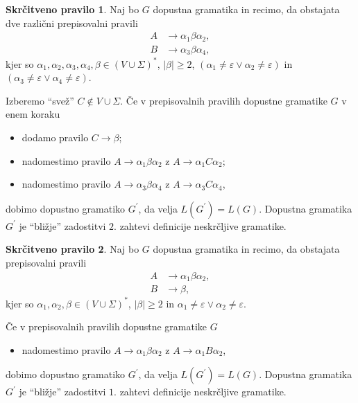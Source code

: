\documentclass[fin1, tisk]{fmfdelo}
\providecommand{\abs}[1]{\left\lvert #1 \right\rvert}
\theoremstyle{definition}
\newtheorem{pravilo}{Skrčitveno pravilo}
\begin{document}
\begin{pravilo}
    Naj bo $G$ dopustna gramatika in recimo, da obstajata dve različni prepisovalni pravili
    \begin{align*}
        A &\rightarrow \alpha_1 \beta \alpha_2, \\
        B &\rightarrow \alpha_3 \beta \alpha_4,
    \end{align*}
    kjer so $\alpha_1, \alpha_2, \alpha_3, \alpha_4, \beta \in (V \cup \Sigma)^*$, $\abs{\beta} \geq 2$,
    $(\alpha_1 \neq \varepsilon \vee \alpha_2 \neq \varepsilon)$ in 
    $(\alpha_3 \neq \varepsilon \vee \alpha_4 \neq \varepsilon)$.

    Izberemo ``svež'' $C \notin V \cup \Sigma$. Če v prepisovalnih 
    pravilih dopustne gramatike $G$ v enem koraku
    \begin{itemize}
        \item dodamo pravilo $C \rightarrow \beta$;
        \item nadomestimo pravilo $A \rightarrow \alpha_1 \beta \alpha_2$ 
        z $A \rightarrow \alpha_1 C \alpha_2$;
        \item nadomestimo pravilo $A \rightarrow \alpha_3 \beta \alpha_4$ 
        z $A \rightarrow \alpha_3 C \alpha_4$,
    \end{itemize}
    dobimo dopustno gramatiko $G^\prime$, da velja $L(G^\prime) = L(G)$. Dopustna gramatika 
    $G^\prime$ je ``bližje'' zadostitvi $2.$ zahtevi definicije neskrčljive gramatike.
\end{pravilo}

\begin{pravilo}
    Naj bo $G$ dopustna gramatika in recimo, da obstajata prepisovalni pravili
    \begin{align*}
        A &\rightarrow \alpha_1 \beta \alpha_2, \\
        B &\rightarrow \beta,
    \end{align*}
    kjer so $\alpha_1, \alpha_2, \beta \in (V \cup \Sigma)^*$, $\abs{\beta} \geq 2$
    in $\alpha_1 \neq \varepsilon \vee \alpha_2 \neq \varepsilon$.

    Če v prepisovalnih pravilih dopustne gramatike $G$
    \begin{itemize}
        \item nadomestimo pravilo $A \rightarrow \alpha_1 \beta \alpha_2$ z
        $A \rightarrow \alpha_1 B \alpha_2$,
    \end{itemize}
    dobimo dopustno gramatiko $G^\prime$, da velja $L(G^\prime) = L(G)$. Dopustna gramatika 
    $G^\prime$ je ``bližje'' zadostitvi $1.$ zahtevi definicije neskrčljive gramatike.
\end{pravilo}
\end{document}
